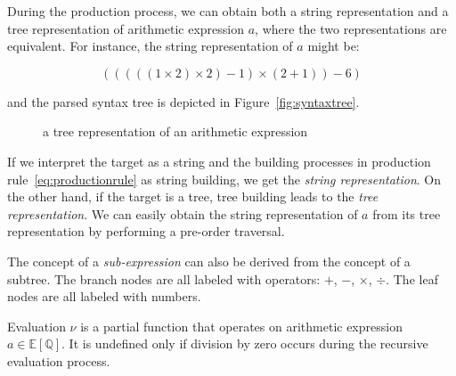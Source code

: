 \documentclass{article}
\numberwithin{definition}{section}
\numberwithin{lemma}{section}
\numberwithin{proposition}{section}
\numberwithin{corollary}{section}
\numberwithin{theorem}{section}
\begin{document}
During the production process, we can obtain both a string representation and a tree representation of arithmetic expression $a$,
where the two representations are equivalent.
For instance, the string representation of $a$ might be:

\begin{equation}
    (((((1 \times 2) \times 2) - 1) \times (2 + 1)) - 6)\label{eq:equation}
\end{equation}

and the parsed syntax tree is depicted in Figure~\ref{fig:syntaxtree}.

\begin{figure}[ht]
    \centering
    \caption{a tree representation of an arithmetic expression}\label{fig:syntaxtree}\label{fig:figure}
\end{figure}

If we interpret the target as a string and the building processes in production rule~\eqref{eq:productionrule} as string building, we get the \emph{string representation}.
On the other hand, if the target is a tree, tree building leads to the \emph{tree representation}.
We can easily obtain the string representation of $a$ from its tree representation by performing a pre-order traversal.

The concept of a \emph{sub-expression} can also be derived from the concept of a subtree.
The branch nodes are all labeled with operators: $+$, $-$, $\times$, $\div$.
The leaf nodes are all labeled with numbers.

Evaluation $\nu$ is a partial function that operates on arithmetic expression $a \in \mathbb{E} \left [\mathbb{Q} \right ]$.
It is undefined only if division by zero occurs during the recursive evaluation process.
\end{document}
